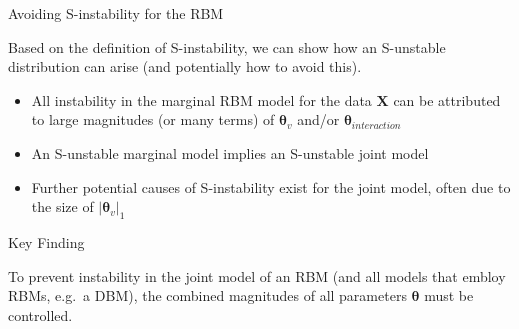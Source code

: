 \documentclass[ignorenonframetext,]{beamer}
\providecommand{\tightlist}{%
  \setlength{\itemsep}{0pt}\setlength{\parskip}{0pt}}
\theoremstyle{definition}
\begin{document}
\begin{frame}{Avoiding S-instability for the RBM}
\protect\hypertarget{avoiding-s-instability-for-the-rbm}{}

Based on the definition of S-instability, we can show how an S-unstable
distribution can arise (and potentially how to avoid this).

\begin{itemize}
\tightlist
\item
  All instability in the marginal RBM model for the data
  \(\boldsymbol X\) can be attributed to large magnitudes (or many
  terms) of \(\boldsymbol \theta_{v}\) and/or
  \(\boldsymbol \theta_{interaction}\)
\item
  An S-unstable marginal model implies an S-unstable joint model
\item
  Further potential causes of S-instability exist for the joint model,
  often due to the size of \(|\boldsymbol \theta_{v}|_1\)
\end{itemize}

\begin{block}{Key Finding}

To prevent instability in the joint model of an RBM (and all models that
embloy RBMs, e.g.~a DBM), the combined magnitudes of all parameters
\(\boldsymbol \theta\) must be controlled.

\end{block}

\end{frame}
\end{document}
